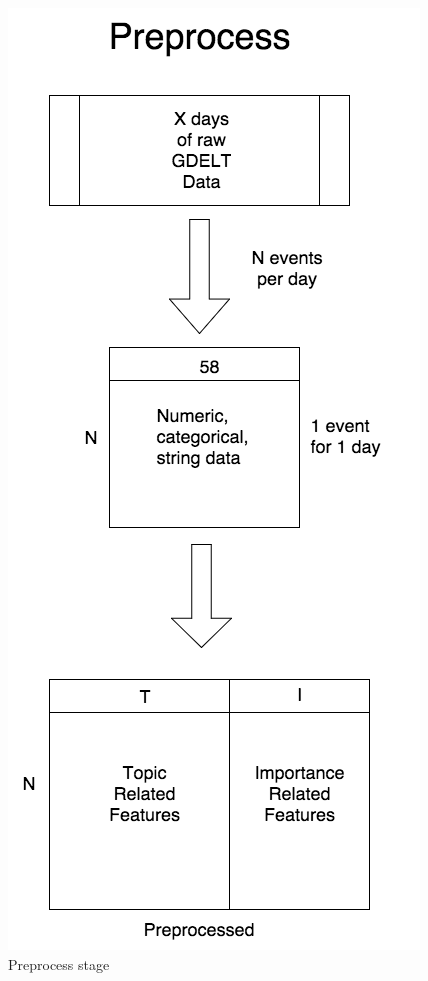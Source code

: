 
\begin{figure}[ht]
\vskip 0.2in
\begin{center}
\centerline{\includegraphics[scale=0.15]{images/preprocess_vertical.png}}
\caption{Preprocess stage}
\end{center}
\vskip -0.2in
\label{fig:preprocess}
\end{figure} 


